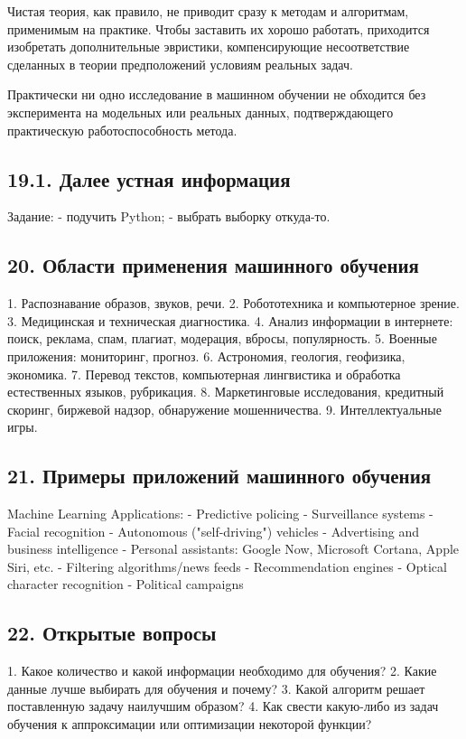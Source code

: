 Чистая теория, как правило, не приводит сразу к методам и алгоритмам,
применимым на практике.
Чтобы заставить их хорошо работать, приходится изобретать дополнительные
эвристики, компенсирующие несоответствие сделанных в теории предположений
условиям реальных задач.

Практически ни одно исследование в машинном обучении не обходится без
эксперимента на модельных или реальных данных, подтверждающего
практическую работоспособность метода.

\subsection{19.1. Далее устная информация}

Задание:
- подучить Python;
- выбрать выборку откуда-то.

\subsection{20. Области применения машинного обучения}

1. Распознавание образов, звуков, речи.
2. Робототехника и компьютерное зрение.
3. Медицинская и техническая диагностика.
4. Анализ информации в интернете: поиск, реклама, спам, плагиат, модерация,
вбросы, популярность.
5. Военные приложения: мониторинг, прогноз.
6. Астрономия, геология, геофизика, экономика.
7. Перевод текстов, компьютерная лингвистика и обработка естественных
языков, рубрикация.
8. Маркетинговые исследования, кредитный скоринг, биржевой надзор,
обнаружение мошенничества.
9. Интеллектуальные игры.

\subsection{21. Примеры приложений машинного обучения}

Machine Learning Applications:
- Predictive policing
- Surveillance systems
- Facial recognition
- Autonomous ("self-driving") vehicles
- Advertising and business intelligence
- Personal assistants: Google Now, Microsoft Cortana, Apple Siri, etc.
- Filtering algorithms/news feeds
- Recommendation engines
- Optical character recognition
- Political campaigns

\subsection{22. Открытые вопросы}

1. Какое количество и какой информации необходимо для обучения?
2. Какие данные лучше выбирать для обучения и почему?
3. Какой алгоритм решает поставленную задачу наилучшим образом?
4. Как свести какую-либо из задач обучения к аппроксимации или
оптимизации некоторой функции?

